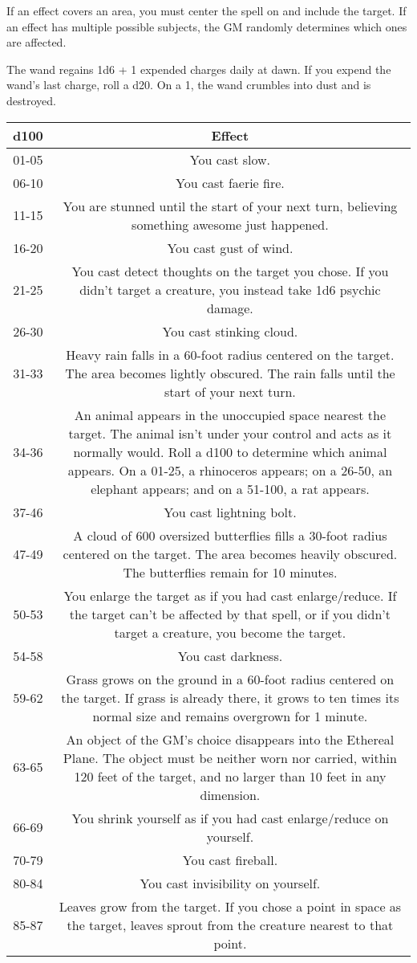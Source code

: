 \documentclass[
]{article}
\begin{document}
If an effect covers an area, you must center the spell on and include
the target. If an effect has multiple possible subjects, the GM randomly
determines which ones are affected.

The wand regains 1d6 + 1 expended charges daily at dawn. If you expend
the wand's last charge, roll a d20. On a 1, the wand crumbles into dust
and is destroyed.

\begin{longtable}[]{@{}cc@{}}
\toprule
d100 & Effect\tabularnewline
\midrule
\endhead
01-05 & You cast slow.\tabularnewline
06-10 & You cast faerie fire.\tabularnewline
11-15 & You are stunned until the start of your next turn, believing
something awesome just happened.\tabularnewline
16-20 & You cast gust of wind.\tabularnewline
21-25 & You cast detect thoughts on the target you chose. If you didn't
target a creature, you instead take 1d6 psychic damage.\tabularnewline
26-30 & You cast stinking cloud.\tabularnewline
31-33 & Heavy rain falls in a 60-foot radius centered on the target. The
area becomes lightly obscured. The rain falls until the start of your
next turn.\tabularnewline
34-36 & An animal appears in the unoccupied space nearest the target.
The animal isn't under your control and acts as it normally would. Roll
a d100 to determine which animal appears. On a 01-25, a rhinoceros
appears; on a 26-50, an elephant appears; and on a 51-100, a rat
appears.\tabularnewline
37-46 & You cast lightning bolt.\tabularnewline
47-49 & A cloud of 600 oversized butterflies fills a 30-foot radius
centered on the target. The area becomes heavily obscured. The
butterflies remain for 10 minutes.\tabularnewline
50-53 & You enlarge the target as if you had cast enlarge/reduce. If the
target can't be affected by that spell, or if you didn't target a
creature, you become the target.\tabularnewline
54-58 & You cast darkness.\tabularnewline
59-62 & Grass grows on the ground in a 60-foot radius centered on the
target. If grass is already there, it grows to ten times its normal size
and remains overgrown for 1 minute.\tabularnewline
63-65 & An object of the GM's choice disappears into the Ethereal Plane.
The object must be neither worn nor carried, within 120 feet of the
target, and no larger than 10 feet in any dimension.\tabularnewline
66-69 & You shrink yourself as if you had cast enlarge/reduce on
yourself.\tabularnewline
70-79 & You cast fireball.\tabularnewline
80-84 & You cast invisibility on yourself.\tabularnewline
85-87 & Leaves grow from the target. If you chose a point in space as
the target, leaves sprout from the creature nearest to that point.

\end{longtable}
\end{document}
